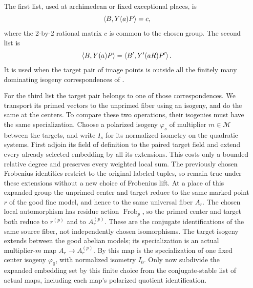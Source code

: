 The first list, used at archimedean or fixed exceptional places, is
\begin{equation}\label{eq:constant-system}
 \left\langle B,Y(a)P\right\rangle=c,
\end{equation}
where the $2$-by-$2$ rational matrix $c$ is common to the chosen group.
The second list is
\begin{equation}\label{eq:paired-system}
 \left\langle B,Y(a)P\right\rangle=\left\langle B',Y'(aR)P'\right\rangle.
\end{equation}
It is used when the target pair of image points is outside all the
finitely many dominating isogeny correspondences of
.

For the third list the target pair belongs to one of those
correspondences.  We transport its primed vectors to the unprimed fiber
using an isogeny, and do the same at the centers.  To compare these two
operations, their isogenies must have the same specialization.
Choose a polarized isogeny $\varphi_s$ of multiplier
$m\in\mathcal M$ between the targets, and write $I_s$ for its normalized
isometry on the quadratic systems.  First adjoin its field of definition
to the paired target field and extend every already selected embedding
by all its extensions.  This costs only a bounded relative degree and
preserves every weighted local sum.  The previously chosen Frobenius
identities restrict to the original labeled tuples, so remain true
under these extensions without a new choice of Frobenius lift.
At a place of this expanded group the unprimed center and target reduce to the
same marked point $r$ of the good fine model, and hence to the same
universal fiber $A_r$.  The chosen local automorphism has residue action
$\operatorname{Frob}_p$, so the primed center and target both reduce to
$r^{(p)}$ and to $A_r^{(p)}$.  These are the conjugate identifications
of the same source fiber, not independently chosen isomorphisms.
The target isogeny extends between the good abelian models; its
specialization is an actual multiplier-$m$ map
$A_r\to A_r^{(p)}$.  By  this map
is the specialization of one fixed center isogeny $\varphi_0$, with
normalized isometry $I_0$.  Only now subdivide the expanded embedding
set by this finite choice from the conjugate-stable list of actual
maps, including each map's polarized quotient identification.

